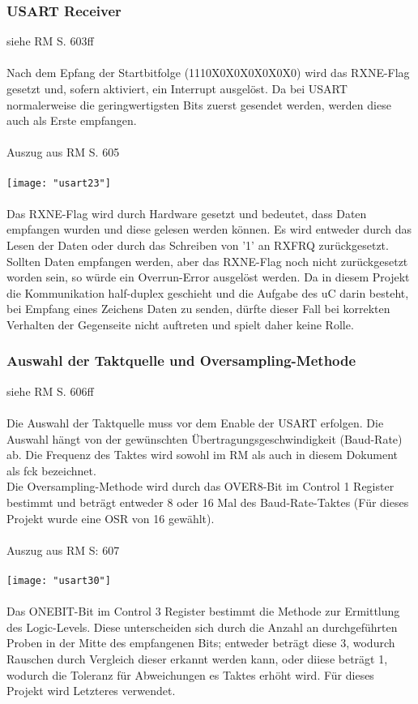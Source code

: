 \documentclass[11pt]{report}
\begin{document}
			\subsubsection{USART Receiver}
				siehe RM S. 603ff\\
				\\Nach dem Epfang der Startbitfolge (1110X0X0X0X0X0X0) wird das RXNE-Flag gesetzt und, sofern aktiviert, ein Interrupt ausgelöst. Da bei USART normalerweise die geringwertigsten Bits zuerst gesendet werden, werden diese auch als Erste empfangen.\\
				\\Auszug aus RM S. 605\\
				\\\texttt{[image: "usart23"]}\\
				\\Das RXNE-Flag wird durch Hardware gesetzt und bedeutet, dass Daten empfangen wurden und diese gelesen werden können. Es wird entweder durch das Lesen der Daten oder durch das Schreiben von '1' an RXFRQ zurückgesetzt. Sollten Daten empfangen werden, aber das RXNE-Flag noch nicht zurückgesetzt worden sein, so würde ein Overrun-Error ausgelöst werden. Da in diesem Projekt die Kommunikation half-duplex geschieht und die Aufgabe des uC darin besteht, bei Empfang eines Zeichens Daten zu senden, dürfte dieser Fall bei korrekten Verhalten der Gegenseite nicht auftreten und spielt daher keine Rolle.
			\subsubsection{Auswahl der Taktquelle und Oversampling-Methode}
				siehe RM S. 606ff\\
				\\Die Auswahl der Taktquelle muss vor dem Enable der USART erfolgen. Die Auswahl hängt von der gewünschten Übertragungsgeschwindigkeit (Baud-Rate) ab. Die Frequenz des Taktes wird sowohl im RM als auch in diesem Dokument als fck bezeichnet.\\
				Die Oversampling-Methode wird durch das OVER8-Bit im Control 1 Register bestimmt und beträgt entweder 8 oder 16 Mal des Baud-Rate-Taktes (Für dieses Projekt wurde eine OSR von 16 gewählt).\\
				\\Auszug aus RM S: 607\\
				\\\texttt{[image: "usart30"]}\\
				\\Das ONEBIT-Bit im Control 3 Register bestimmt die Methode zur Ermittlung des Logic-Levels. Diese unterscheiden sich durch die Anzahl an durchgeführten Proben in der Mitte des empfangenen Bits; entweder beträgt diese 3, wodurch Rauschen durch Vergleich dieser erkannt werden kann, oder diiese beträgt 1, wodurch die Toleranz für Abweichungen es Taktes erhöht wird. Für dieses Projekt wird Letzteres verwendet.
\end{document}
